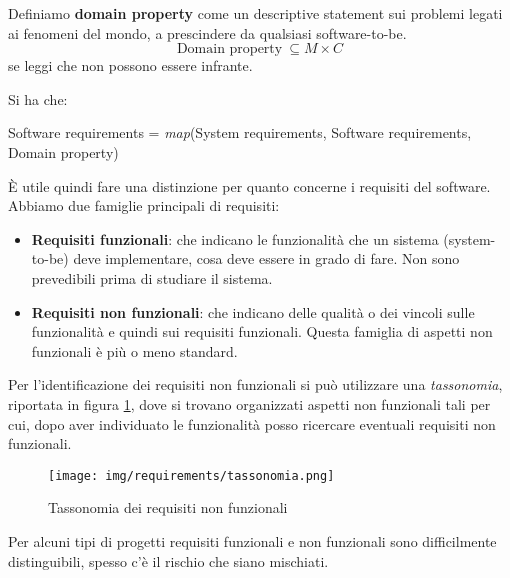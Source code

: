 \begin{definizione}
      Definiamo \textbf{domain property} come un descriptive statement sui problemi
      legati ai fenomeni del mondo, a prescindere da qualsiasi software-to-be.
      \begin{equation}
            \text{Domain property} \ \subseteq M \times C
      \end{equation}
      se leggi che non possono essere infrante.
\end{definizione}
Si ha che:
\begin{center}
      Software requirements = \textit{map}(System requirements, Software
      requirements, Domain property)
\end{center}
È utile quindi fare una distinzione per quanto concerne i requisiti del software.
Abbiamo due famiglie principali di requisiti:
\begin{itemize}
      \item \textbf{Requisiti funzionali}: che indicano le funzionalità che un
            sistema (system-to-be) deve implementare, cosa deve essere in grado
            di fare. Non sono prevedibili prima di studiare il sistema.
      \item \textbf{Requisiti non funzionali}: che indicano delle qualità o dei
            vincoli sulle funzionalità e quindi sui requisiti funzionali. Questa
            famiglia di aspetti non funzionali è più o meno standard.
\end{itemize}
Per l'identificazione dei requisiti non funzionali si può utilizzare una
\textit{tassonomia}, riportata in figura \ref{fig:tasso}, dove si trovano
organizzati aspetti non funzionali tali per cui, dopo aver individuato le
funzionalità posso ricercare eventuali requisiti non funzionali.
\begin{figure}[!ht]
      \centering
      \texttt{[image: img/requirements/tassonomia.png]}
      \caption{Tassonomia dei requisiti non funzionali}
      \label{fig:tasso}
\end{figure}
Per alcuni tipi di progetti requisiti funzionali e non funzionali sono
difficilmente distinguibili, spesso c'è il rischio che siano mischiati.

